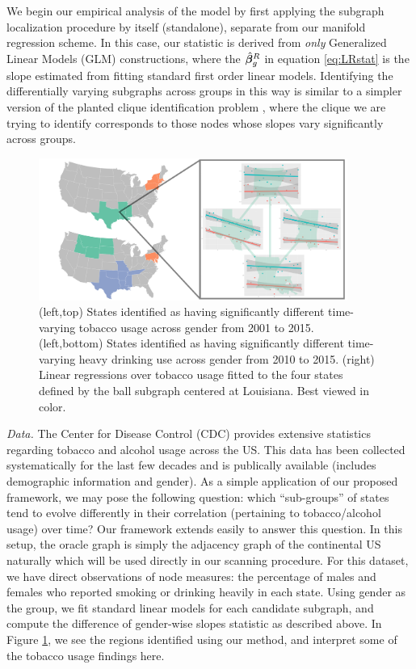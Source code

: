 We begin our empirical analysis of the model by first applying the subgraph localization procedure by itself (standalone), separate from our manifold regression scheme. In this case, our statistic is derived from {\em only} Generalized Linear Models (GLM) constructions, where the $\hat{\bm{\beta}}_g^R$ in equation \eqref{eq:LRstat} is the slope estimated from fitting standard first order linear models. Identifying the differentially varying subgraphs across groups in this way is similar to a simpler version of the planted clique identification problem \cite{arora2009computational}, where the clique we are trying to identify corresponds to those nodes whose slopes vary significantly across groups.
\begin{figure}[]
	\begin{center}
		\includegraphics[trim={0cm 0cm 0cm 0cm}, clip, width=0.9\textwidth]{3_covtraj/figs/tobacco_zoom.pdf}
	\end{center}
	\caption[Tobacco use state relationships via covariance trajectory analysis]{(left,top) States identified as having significantly different time-varying tobacco usage across gender from 2001 to 2015. (left,bottom) States identified as having significantly different time-varying heavy drinking use across gender from 2010 to 2015. (right) Linear regressions over tobacco usage fitted to the four states defined by the ball subgraph centered at Louisiana. Best viewed in color.}
	\label{fig:tobalc}
\end{figure}

{\em Data.} The Center for Disease Control (CDC) provides extensive statistics regarding tobacco and alcohol usage across the US. This data has been collected systematically for the last few decades and is publically available (includes demographic information and gender). As a simple application of our 
proposed framework, 
we may pose the following question: which ``sub-groups'' of states tend to evolve differently in their correlation (pertaining to tobacco/alcohol usage) over time? 
Our framework extends easily to answer this question. In this setup, the oracle graph is simply the adjacency graph of the continental
US naturally which will be used directly in our scanning procedure.
For this dataset, we have direct observations of node measures: the percentage of males and females who 
reported smoking or drinking heavily in each state. Using 
gender as the group, 
we fit standard linear models for each candidate subgraph, and compute the difference of gender-wise 
slopes statistic as described above. 
In Figure \ref{fig:tobalc}, we see the regions identified using our method, and interpret some of the tobacco usage findings here.

